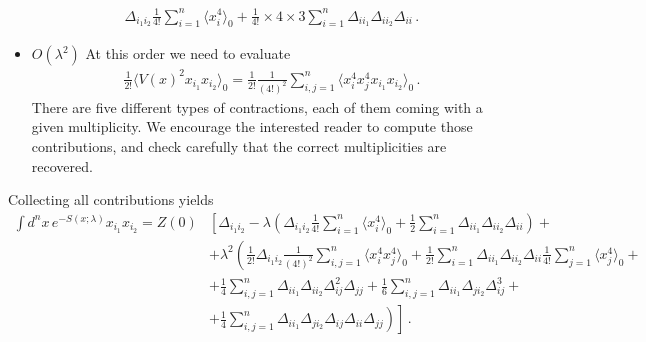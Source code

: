 \begin{itemize}
\begin{align}
    \Delta_{i_1 i_2} \frac{1}{4!} \sum_{i=1}^n \langle x_i^4\rangle_0
    + \frac{1}{4!} \times 4 \times 3 \sum_{i=1}^n \Delta_{i i_1}
    \Delta_{i i_2} \Delta_{i i} \, .
  \end{align}
\item $O(\lambda^2)$ At this order we need to evaluate
  \begin{align}
    \frac{1}{2!} \langle V(x)^2 x_{i_1} x_{i_2} \rangle_0 = 
    \frac{1}{2!} \frac{1}{(4!)^2} \sum_{i,j=1}^n \langle x_i^4 x_j^4
    x_{i_1} x_{i_2} \rangle_0\, .
  \end{align}
  There are five different types of contractions, each of them coming
  with a given multiplicity. We encourage the interested reader to
  compute those contributions, and check carefully that the correct
  multiplicities are recovered. 
\end{itemize}
Collecting all contributions yields
\begin{align}
  \int d^nx\, e^{-S(x;\lambda)} 
  x_{i_1} x_{i_2} = Z(0) & 
                           \left[
                           \Delta_{i_1 i_2} - \lambda \left(\Delta_{i_1 i_2}
                           \frac{1}{4!} \sum_{i=1}^n \langle
                           x_i^4\rangle_0 +  \frac12 \sum_{i=1}^n
                           \Delta_{i i_1} \Delta_{i i_2} \Delta_{i i} 
                           \right) + \right. \nonumber \\
                         & \left.
                           + \lambda^2 \left( 
                           \frac{1}{2!} \Delta_{i_1 i_2} \frac{1}{(4!)^2}
                           \sum_{i,j=1}^n \langle x_i^4 x_j^4 \rangle_0
                           + \frac{1}{2!} \sum_{i=1}^n \Delta_{i i_1}
                           \Delta_{i i_2} \Delta_{i i}  \frac{1}{4!}
                           \sum_{j=1}^n \langle x_j^4 \rangle_0
                           + \right. \right. \nonumber \\
                         & + \left. \left.
                           \frac{1}{4} \sum_{i,j=1}^n \Delta_{i i_1}
                           \Delta_{i i_2} \Delta_{i j}^2 \Delta_{jj}
                           + \frac{1}{6} \sum_{i,j=1}^n \Delta_{i i_1}
                           \Delta_{j i_2} \Delta_{i j}^3 +
                           \right. \right. \nonumber \\
  \label{eq:TwoPointNotNorm}
                         & + \left. \left.
                           \frac{1}{4} \sum_{i,j=1}^n \Delta_{i i_1}
                           \Delta_{j i_2} \Delta_{i j} \Delta_{ii}\Delta_{jj}
                           \right)
                           \right]\, .
\end{align}

